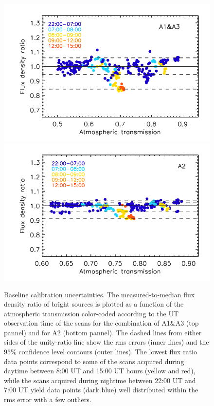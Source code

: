 %
\begin{figure}[!thbp]
  \begin{center}
      \includegraphics[clip=true, trim={0.9cm, 0, 0.5cm, 0.6cm},width=0.75\linewidth]{Figures/plot_flux_density_ratio_obstau_allbright_obsdate_corrected_skydip_rescaled_1mm.pdf}
     \includegraphics[clip=true, trim={0.9cm, 0, 0.5cm, 0.6cm},width=0.75\linewidth]{Figures/plot_flux_density_ratio_obstau_allbright_obsdate_corrected_skydip_rescaled_a2.pdf} 


    \caption[Baseline calibration rms error estimate]{Baseline
      calibration uncertainties. The
      measured-to-median flux density ratio of bright sources is
      plotted as a function of the atmospheric transmission
      color-coded according to the UT
      observation time of the scans for the combination of A1$\&$A3
      (top pannel)
      and for A2 (bottom pannel).
      The dashed lines from either sides of the
      unity-ratio line show the rms errors (inner lines) {\lp and the
      $95\%$ confidence level contours (outer lines).}
      The lowest flux ratio data points correspond to some of the
      scans acquired during daytime between 8:00 UT and 15:00 UT
      hours (yellow and red), while the scans acquired during nightime
      between 22:00 UT and 7:00 UT yield data points (dark blue)
      well distributed within the rms error with a few outliers.}
    \label{fig:allbright_rms_corrected_skydip}
  \end{center}
\end{figure}
